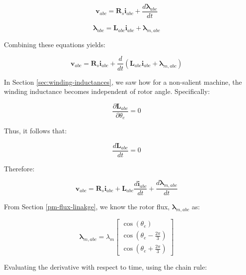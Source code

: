 \documentclass{article}
\begin{document}
\begin{equation}
\label{eqn80}
    \mathbf{v}_{abc} = \mathbf{R}_s\mathbf{i}_{abc} + \frac{d\boldsymbol{\lambda}_{abc}}{dt}
\end{equation}

\begin{equation}
\label{eqn81}
    \boldsymbol{\lambda}_{abc} = \mathbf{L}_{abc}\mathbf{i}_{abc} + \boldsymbol{\lambda}_{m,abc}
\end{equation}

Combining these equations yields:

\begin{equation}
    \mathbf{v}_{abc} = \mathbf{R}_s\mathbf{i}_{abc} + \frac{d}{dt} \left( \mathbf{L}_{abc}\mathbf{i}_{abc} + \boldsymbol{\lambda}_{m,abc} \right)
\end{equation}

In Section \ref{sec:winding-inductances}, we saw how for a non-salient machine, the winding inductance becomes independent of rotor angle. Specifically:

\begin{equation}
    \frac{\partial \boldsymbol{L}_{abc}}{\partial \theta_e} = 0
\end{equation}

Thus, it follows that:

\begin{equation}
    \frac{d\boldsymbol{L}_{abc}}{dt} = 0
\end{equation}

Therefore:

\begin{equation}
    \mathbf{v}_{abc} = \mathbf{R}_s\mathbf{i}_{abc} + \mathbf{L}_{abc}\frac{d\mathbf{i}_{abc}}{dt} + \frac{d\boldsymbol{\lambda}_{m,abc}}{dt}
\end{equation}

From Section \ref{pm-flux-linakge}, we know the rotor flux, $\boldsymbol{\lambda}_{m,abc}$ as:

\begin{equation}
    \boldsymbol{\lambda}_{m,abc} = \lambda_m
    \begin{bmatrix}
        \cos(\theta_e) \\[4pt]
        \cos\left(\theta_e-\frac{2\pi}{3}\right) \\[4pt]
        \cos\left(\theta_e+\frac{2\pi}{3}\right)
    \end{bmatrix}
\end{equation}

Evaluating the derivative with respect to time, using the chain rule:
\end{document}
